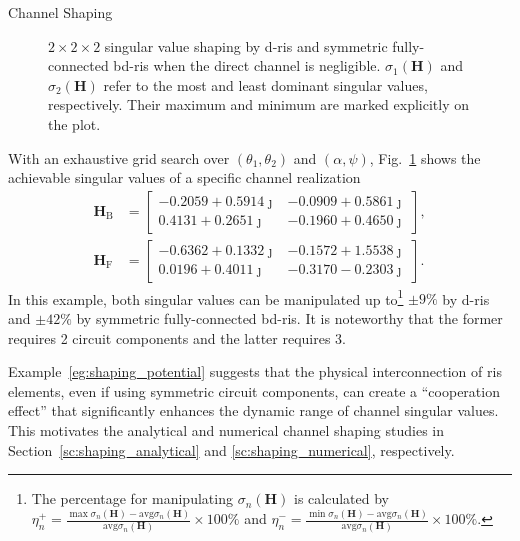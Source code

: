 \documentclass[journal]{IEEEtran}
\begin{document}
\begin{section}{Channel Shaping}
\begin{example}
\begin{figure}
			\caption{$2 \times 2 \times 2$ singular value shaping by \gls{d}-\gls{ris} and symmetric fully-connected \gls{bd}-\gls{ris} when the direct channel is negligible. $\sigma_1(\mathbf{H})$ and $\sigma_2(\mathbf{H})$ refer to the most and least dominant singular values, respectively.
				Their maximum and minimum are marked explicitly on the plot.}
			\label{fg:shaping_potential}
		\end{figure}
		With an exhaustive grid search over $(\theta_1, \theta_2)$ and $(\alpha, \psi)$, Fig.~\ref{fg:shaping_potential} shows the achievable singular values of a specific channel realization
		\begin{equation*}
			\begin{split}
				\mathbf{H}_\mathrm{B} & =
				\begin{bmatrix}
					-0.2059 + 0.5914 \jmath & -0.0909 + 0.5861 \jmath \\
					0.4131 + 0.2651 \jmath  & -0.1960 + 0.4650 \jmath
				\end{bmatrix},
				\\
				\mathbf{H}_\mathrm{F} & =
				\begin{bmatrix}
					-0.6362 + 0.1332 \jmath & -0.1572 + 1.5538 \jmath \\
					0.0196 + 0.4011 \jmath  & -0.3170 - 0.2303 \jmath
				\end{bmatrix}.
			\end{split}
		\end{equation*}
		In this example, both singular values can be manipulated up to\footnote{The percentage for manipulating $\sigma_n(\mathbf{H})$ is calculated by $\eta_n^+ = \frac{\max \sigma_n(\mathbf{H}) - \mathrm{avg} \sigma_n(\mathbf{H})}{\mathrm{avg} \sigma_n(\mathbf{H})} \times 100\%$ and  $\eta_n^- = \frac{\min \sigma_n(\mathbf{H}) - \mathrm{avg} \sigma_n(\mathbf{H})}{\mathrm{avg} \sigma_n(\mathbf{H})} \times 100\%$.} $\pm 9\%$ by \gls{d}-\gls{ris} and $\pm 42\%$ by symmetric fully-connected \gls{bd}-\gls{ris}.
		It is noteworthy that the former requires 2 circuit components and the latter requires 3.
	\end{example}

	Example~\ref{eg:shaping_potential} suggests that the physical interconnection of \gls{ris} elements, even if using symmetric circuit components, can create a ``cooperation effect'' that significantly enhances the dynamic range of channel singular values.
	This motivates the analytical and numerical channel shaping studies in Section~\ref{sc:shaping_analytical} and \ref{sc:shaping_numerical}, respectively.


\end{section}
\end{document}
